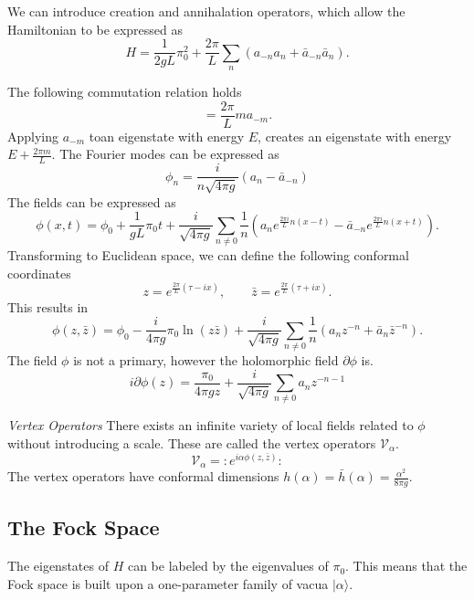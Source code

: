 \documentclass[submission, PhysLectNotes]{SciPost}
\begin{document}
We can introduce creation and annihalation operators, which allow the Hamiltonian to be expressed as
\begin{equation}
  H = \frac{1}{2gL}\pi_0^2+\frac{2\pi}{L}\sum_n\left(a_{-n}a_n+\bar{a}_{-n}\bar{a}_n\right).
\end{equation}

The following commutation relation holds
\begin{equation}
  [H,a_{-m}] = \frac{2\pi}{L}ma_{-m}.
\end{equation}
Applying $a_{-m}$ toan eigenstate with energy $E$, creates an eigenstate with energy $E+\frac{2\pi m}{L}$.
The Fourier modes can be expressed as
\begin{equation}
  \phi_n = \frac{i}{n\sqrt{4\pi g}}(a_n-\bar{a}_{-n})
\end{equation}
The fields can be expressed as
\begin{equation}
  \phi(x,t) = \phi_0 + \frac{1}{gL}\pi_0t + \frac{i}{\sqrt{4\pi g}}\sum_{n \neq 0}\frac{1}{n}\left(a_ne^{\frac{2\pi i}{L} n(x-t)}-\bar{a}_{-n}e^{\frac{2\pi i}{L} n(x+t)}\right).
\end{equation}
Transforming to Euclidean space, we can define the following conformal coordinates
\begin{equation}
  z = e^{\frac{2\pi}{L}(\tau-ix)}, \qquad \bar{z} = e^{\frac{2\pi}{L}(\tau+ix)}.
\end{equation}
This results in
\begin{equation}
  \phi(z,\bar{z}) = \phi_0 - \frac{i}{4\pi g}\pi_0\ln(z\bar{z}) + \frac{i}{\sqrt{4\pi g}}\sum_{n \neq 0}\frac{1}{n}\left(a_n z^{-n}+\bar{a}_{n}\bar{z}^{-n}\right).
\end{equation}
The field $\phi$ is not a primary, however the holomorphic field $\partial \phi$ is.
\begin{equation}
  i \partial \phi(z)  = \frac{\pi_0}{4\pi g z}+\frac{i}{\sqrt{4\pi g}}\sum_{n \neq 0} a_n z^{-n-1}
\end{equation}

{\it Vertex Operators}
There exists an infinite variety of local fields related to $\phi$ without introducing a scale. These are called the vertex operators $\mathcal{V}_\alpha$.
\begin{equation}
  \mathcal{V}_\alpha = :e^{i\alpha\phi(z,\bar{z})}:
\end{equation}
The vertex operators have conformal dimensions $h(\alpha)=\bar{h}(\alpha) = \frac{\alpha^2}{8\pi g}$.
\subsection{The Fock Space}
The eigenstates of $H$ can be labeled by the eigenvalues of $\pi_0$. This means that the Fock space is built upon a one-parameter family of vacua $\lvert{\alpha}\rangle$.
\end{document}
